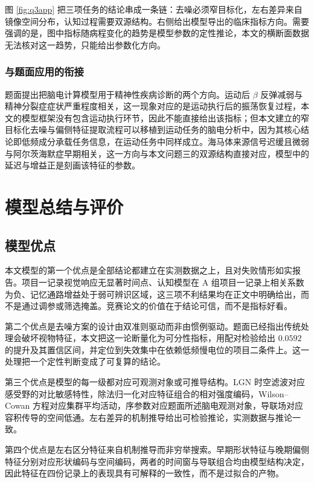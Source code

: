 \documentclass[bwprint]{gmcmthesis}
\begin{document}
图 \ref{fig:q3app} 把三项任务的结论串成一条链：去噪必须窄目标化，左右差异来自镜像空间分布，认知过程需要双源结构。右侧给出模型导出的临床指标方向。需要强调的是，图中指标随病程变化的趋势是模型参数的定性推论，本文的横断面数据无法核对这一趋势，只能给出参数化方向。

\subsubsection{与题面应用的衔接}

题面提出把脑电计算模型用于精神性疾病诊断的两个方向。运动后 $\beta$ 反弹减弱与精神分裂症症状严重程度相关，这一现象对应的是运动执行后的振荡恢复过程，本文的模型框架没有包含运动执行环节，因此不能直接给出该指标；但本文建立的窄目标化去噪与偏侧特征提取流程可以移植到运动任务的脑电分析中，因为其核心结论即低频成分承载任务信息，在运动任务中同样成立。海马体来源信号迟缓且微弱与阿尔茨海默症早期相关，这一方向与本文问题三的双源结构直接对应，模型中的延迟与增益正是刻画该特征的参数。

\section{模型总结与评价}

\subsection{模型优点}

本文模型的第一个优点是全部结论都建立在实测数据之上，且对失败情形如实报告。项目一记录视觉响应无显著时间点、认知模型在 A 组项目一记录上相关系数为负、记忆通路增益处于弱可辨识区域，这三项不利结果均在正文中明确给出，而不是通过调参或筛选掩盖。竞赛论文的价值在于结论可信，而不是指标好看。

第二个优点是去噪方案的设计由双准则驱动而非由惯例驱动。题面已经指出传统处理会破坏视物特征，本文把这一论断量化为可分性指标，用配对检验给出 $0.0592$ 的提升及其置信区间，并定位到失效集中在依赖低频慢电位的项目二条件上。这一处理把一个定性判断变成了可复算的结论。

第三个优点是模型的每一级都对应可观测对象或可推导结构。LGN 时空滤波对应感受野的对比敏感特性，除法归一化对应特征组合的相对强度编码，Wilson--Cowan 方程对应集群平均活动，序参数对应题面所述脑电观测对象，导联场对应容积传导的空间低通。左右差异的机制推导给出可检验推论，实测数据与推论一致。

第四个优点是左右区分特征来自机制推导而非穷举搜索。早期形状特征与晚期偏侧特征分别对应形状编码与空间编码，两者的时间窗与导联组合均由模型结构决定，因此特征在四份记录上的表现具有可解释的一致性，而不是过拟合的产物。
\end{document}
